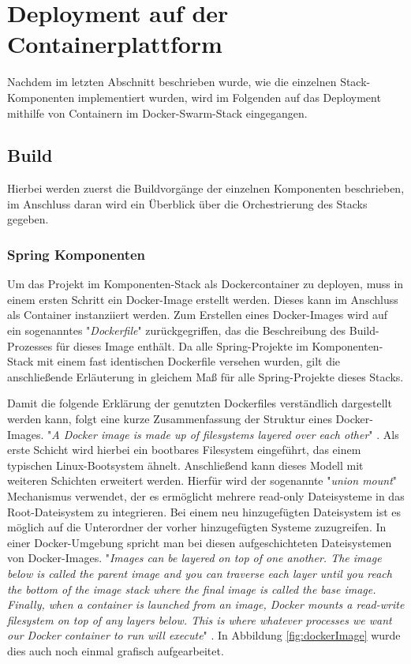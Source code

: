 \section{Deployment auf der Containerplattform}
Nachdem im letzten Abschnitt beschrieben wurde, wie die einzelnen Stack-Komponenten implementiert wurden, wird im Folgenden auf das Deployment mithilfe von Containern im Docker-Swarm-Stack eingegangen. 

\subsection{Build}
Hierbei werden zuerst die Buildvorgänge der einzelnen Komponenten beschrieben, im Anschluss daran wird ein Überblick über die Orchestrierung des Stacks gegeben.

\subsubsection{Spring Komponenten}

Um das Projekt im Komponenten-Stack als Dockercontainer zu deployen, muss in einem ersten Schritt ein Docker-Image erstellt werden. Dieses kann im Anschluss als Container instanziiert werden. Zum Erstellen eines Docker-Images wird auf ein sogenanntes "\emph{Dockerfile}" zurückgegriffen, das die Beschreibung des Build-Prozesses für dieses Image enthält. Da alle Spring-Projekte im Komponenten-Stack mit einem fast identischen Dockerfile versehen wurden, gilt die anschließende Erläuterung in gleichem Maß für alle Spring-Projekte dieses Stacks.

Damit die folgende Erklärung der genutzten Dockerfiles verständlich dargestellt werden kann, folgt eine kurze Zusammenfassung der Struktur eines Docker-Images. "\emph{A Docker image is made up of filesystems layered over each other}" \cite[Seite~71]{turnbulldocker}. Als erste Schicht wird hierbei ein bootbares Filesystem eingeführt, das einem typischen Linux-Bootsystem ähnelt. Anschließend kann dieses Modell mit weiteren Schichten erweitert werden. Hierfür wird der sogenannte "\emph{union mount}" Mechanismus verwendet, der es ermöglicht mehrere read-only Dateisysteme in das Root-Dateisystem zu integrieren. Bei einem neu hinzugefügten Dateisystem ist es möglich auf die Unterordner der vorher hinzugefügten Systeme zuzugreifen. In einer Docker-Umgebung spricht man bei diesen aufgeschichteten Dateisystemen von Docker-Images. "\emph{Images can be layered on top of one another.  The image below is called the parent image and you can traverse each layer until you reach the bottom of the image stack where the final image is called the base image.  Finally, when a container is launched from an image, Docker mounts a read-write filesystem on top of any layers below. This is where whatever processes we want our Docker container to run will execute}" \cite[Seite~71]{turnbulldocker}. In Abbildung \ref{fig:dockerImage} wurde dies auch noch einmal grafisch aufgearbeitet.

